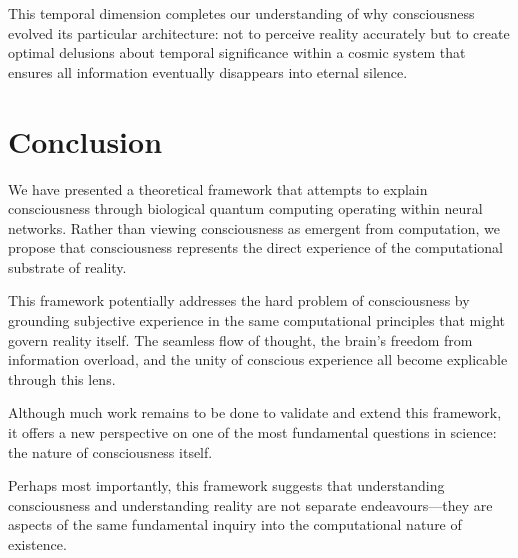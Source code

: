 \documentclass[12pt]{article}
\begin{document}
This temporal dimension completes our understanding of why consciousness evolved its particular architecture: not to perceive reality accurately but to create optimal delusions about temporal significance within a cosmic system that ensures all information eventually disappears into eternal silence.

\section{Conclusion}

We have presented a theoretical framework that attempts to explain consciousness through biological quantum computing operating within neural networks. Rather than viewing consciousness as emergent from computation, we propose that consciousness represents the direct experience of the computational substrate of reality.

This framework potentially addresses the hard problem of consciousness by grounding subjective experience in the same computational principles that might govern reality itself. The seamless flow of thought, the brain's freedom from information overload, and the unity of conscious experience all become explicable through this lens.

Although much work remains to be done to validate and extend this framework, it offers a new perspective on one of the most fundamental questions in science: the nature of consciousness itself.

Perhaps most importantly, this framework suggests that understanding consciousness and understanding reality are not separate endeavours—they are aspects of the same fundamental inquiry into the computational nature of existence.
\end{document}
